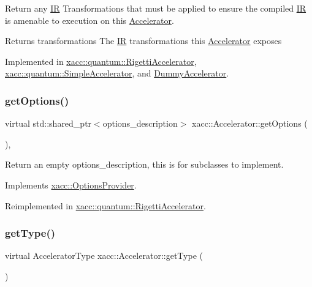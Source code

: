 Return any \hyperlink{a01499}{IR} Transformations that must be applied to ensure the compiled \hyperlink{a01499}{IR} is amenable to execution on this \hyperlink{a01435}{Accelerator}.

\begin{DoxyReturn}{Returns}
transformations The \hyperlink{a01499}{IR} transformations this \hyperlink{a01435}{Accelerator} exposes 
\end{DoxyReturn}


Implemented in \hyperlink{a01083_a443683a1dfb000603c640b2ee303cf66}{xacc\+::quantum\+::\+Rigetti\+Accelerator}, \hyperlink{a01111_afc49c9e7973ba6c6ff9761c36198323d}{xacc\+::quantum\+::\+Simple\+Accelerator}, and \hyperlink{a01143_aac0e2ae753064701468fa1188ac7549f}{Dummy\+Accelerator}.

\mbox{\label{a01435_a98c9eda6b54367c75667ecfbbf167979}} 
\subsubsection{\texorpdfstring{get\+Options()}{getOptions()}}
{\footnotesize\ttfamily virtual std\+::shared\+\_\+ptr$<$options\+\_\+description$>$ xacc\+::\+Accelerator\+::get\+Options (\begin{DoxyParamCaption}{ }\end{DoxyParamCaption})\hspace{0.3cm}{\ttfamily [inline]}, {\ttfamily [virtual]}}

Return an empty options\+\_\+description, this is for subclasses to implement. 

Implements \hyperlink{a01543_a6d150954f852109bfe2c1ae90222926f}{xacc\+::\+Options\+Provider}.



Reimplemented in \hyperlink{a01083_a9ee9e62aecbccf193894ca3388676f9f}{xacc\+::quantum\+::\+Rigetti\+Accelerator}.

\mbox{\label{a01435_aaffc3e4bb9880eb5041b1b58ee4c2665}} 
\subsubsection{\texorpdfstring{get\+Type()}{getType()}}
{\footnotesize\ttfamily virtual Accelerator\+Type xacc\+::\+Accelerator\+::get\+Type (\begin{DoxyParamCaption}{ }\end{DoxyParamCaption})\hspace{0.3cm}{\ttfamily [pure virtual]}}

